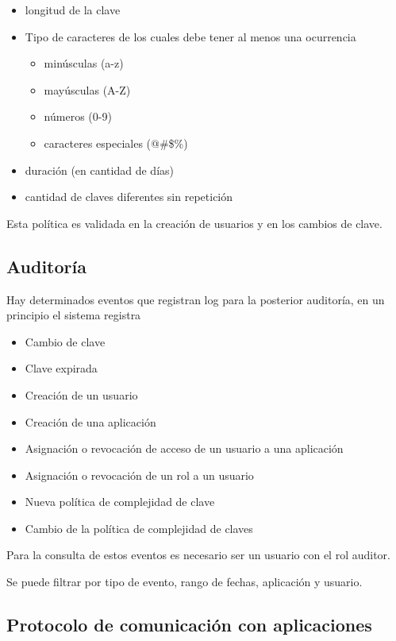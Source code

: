 \begin{itemize}
  \item longitud de la clave
  \item Tipo de caracteres de los cuales debe tener al menos una ocurrencia
  \begin{itemize}
    \item minúsculas (a-z)  
    \item mayúsculas (A-Z)
    \item números (0-9)
    \item caracteres especiales (@\#\$\%)
  \end{itemize}
  \item duración (en cantidad de días)
  \item cantidad de claves diferentes sin repetición
\end{itemize}

Esta política es validada en la creación de usuarios y en los cambios de clave. 

\subsection{Auditoría}

Hay determinados eventos que registran log para la posterior auditoría, en un principio el sistema registra

\begin{itemize}
  \item Cambio de clave
  \item Clave expirada
  \item Creación de un usuario
  \item Creación de una aplicación
  \item Asignación o revocación de acceso de un usuario a una aplicación
  \item Asignación o revocación de un rol a un usuario
  \item Nueva política de complejidad de clave
  \item Cambio de la política de complejidad de claves
\end{itemize}

Para la consulta de estos eventos es necesario ser un usuario con el rol auditor.

Se puede filtrar por tipo de evento, rango de fechas, aplicación y usuario. %

\subsection{Protocolo de comunicación con aplicaciones}


